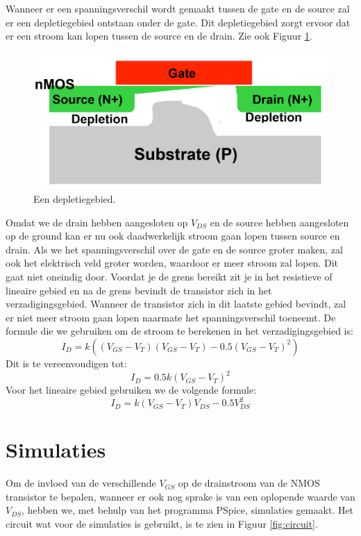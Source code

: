 \documentclass{scrartcl}  %
\begin{document}
Wanneer er een spanningsverschil wordt gemaakt tussen de gate en de source zal er een depletiegebied ontstaan onder de gate. 
Dit depletiegebied zorgt ervoor dat er een stroom kan lopen tussen de source en de drain. 
Zie ook Figuur \ref{fig:depletiegebied}.
\begin{figure}[H]
\centering
	\includegraphics[width=\textwidth]{resources/depletiegebied}
	\caption{Een depletiegebied.\cite{nick-slides}}
	\label{fig:depletiegebied}
\end{figure}
Omdat we de drain hebben aangesloten op $V_{DS}$ en de source hebben aangesloten op de ground kan er nu ook daadwerkelijk stroom gaan lopen tussen source en drain. 
Als we het spanningsverschil over de gate en de source groter maken, zal ook het elektrisch veld groter worden, waardoor er meer stroom zal lopen. 
Dit gaat niet oneindig door. 
Voordat je de grens bereikt zit je in het resistieve of lineaire gebied en na de grens bevindt de transistor zich in het verzadigingsgebied. 
Wanneer de transistor zich in dit laatste gebied bevindt, zal er niet meer stroom gaan lopen naarmate het spanningsverschil toeneemt. 
De formule die we gebruiken om de stroom te berekenen in het verzadigingsgebied is:
\begin{equation}
I_{D} = k((V_{GS} - V_{T})(V_{GS} - V_{T}) - 0.5(V_{GS} - V_{T})^{2})
\end{equation}
\newline Dit is te vereenvoudigen tot: 
\begin{equation} I_{D} = 0.5k(V_{GS} - V_{T})^{2}
\end{equation}
\newline Voor het lineaire gebied gebruiken we de volgende formule: 
\begin{equation}
I_{D} = k(V_{GS} - V_{T})V_{DS} - 0.5V_{DS}^{2}
\end{equation}
\section{Simulaties}
Om de invloed van de verschillende $V_{GS}$ op de drainstroom van de NMOS transistor te bepalen, wanneer er ook nog sprake is van een oplopende waarde van $V_{DS}$, hebben we, met behulp van het programma PSpice, simulaties gemaakt. 
Het circuit wat voor de simulaties is gebruikt, is te zien in Figuur \ref{fig:circuit}. 
\end{document}
